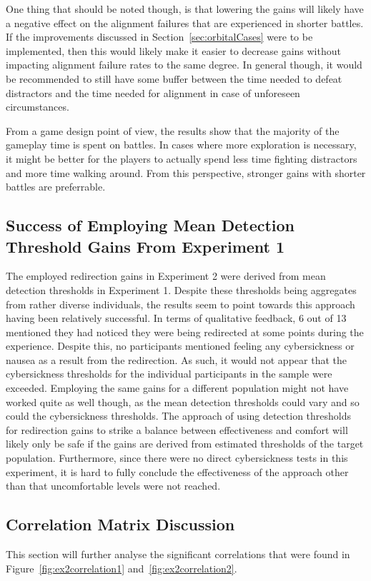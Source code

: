 One thing that should be noted though, is that lowering the gains will likely have a negative effect on the alignment failures that are experienced in shorter battles. If the improvements discussed in Section~\ref{sec:orbitalCases} were to be implemented, then this would likely make it easier to decrease gains without impacting alignment failure rates to the same degree. In general though, it would be recommended to still have some buffer between the time needed to defeat distractors and the time needed for alignment in case of unforeseen circumstances.
   
From a game design point of view, the results show that the majority of the gameplay time is spent on battles. In cases where more exploration is necessary, it might be better for the players to actually spend less time fighting distractors and more time walking around. From this perspective, stronger gains with shorter battles are preferrable. 
   
\subsection{Success of Employing Mean Detection Threshold Gains From Experiment 1}
The employed redirection gains in Experiment 2 were derived from mean detection thresholds in Experiment 1. Despite these thresholds being aggregates from rather diverse individuals, the results seem to point towards this approach having been relatively successful. In terms of qualitative feedback, 6 out of 13 mentioned they had noticed they were being redirected at some points during the experience. Despite this, no participants mentioned feeling any cybersickness or nausea as a result from the redirection. As such, it would not appear that the cybersickness thresholds for the individual participants in the sample were exceeded. Employing the same gains for a different population might not have worked quite as well though, as the mean detection thresholds could vary and so could the cybersickness thresholds. The approach of using detection thresholds for redirection gains to strike a balance between effectiveness and comfort will likely only be safe if the gains are derived from estimated thresholds of the target population. Furthermore, since there were no direct cybersickness tests in this experiment, it is hard to fully conclude the effectiveness of the approach other than that uncomfortable levels were not reached.  

\subsection{Correlation Matrix Discussion}\label{sec:ex2correlationAnalysis}
This section will further analyse the significant correlations that were found in Figure~\ref{fig:ex2correlation1} and~\ref{fig:ex2correlation2}. 

